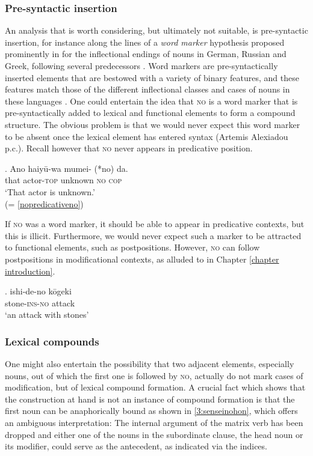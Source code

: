 \subsubsection{Pre-syntactic insertion}

An analysis that is worth considering, but ultimately not suitable, is pre-syntactic insertion, for instance along the lines of a \textit{word marker} hypothesis proposed prominently in \citet{alex:2008:class} for the inflectional endings of nouns in  German,  Russian and  Greek, following several predecessors \citep{harris:1991:exponence, ritter:1993:where, aronoff:1996:morphology, oltra:1999:on, oltra:2005:stress}. Word markers are pre-syntactically inserted elements that are bestowed with a variety of binary features, and these features match those of the different inflectional classes and cases of nouns in these languages \citep[33]{alex:2008:class}. One could entertain the idea that \textsc{no} is a word marker that is pre-syntactically added to lexical and functional elements to form a compound structure. The obvious problem is that we would never expect this word marker to be absent once the lexical element has entered syntax (Artemis Alexiadou p.c.). Recall however that \textsc{no} never appears in predicative position. 

\exg. Ano haiyū-wa mumei- (*no) da.\\
that actor-\textsc{top} unknown \textsc{no} \textsc{cop}\\
`That actor is unknown.’ \\ \null \hfill (= \ref{nopredicativeno})

If \textsc{no} was a word marker, it should be able to appear in predicative contexts, but this is illicit. Furthermore, we would never expect such a marker to be attracted to functional elements, such as postpositions. However, \textsc{no} can follow postpositions in modificational contexts, as alluded to in Chapter \ref{chapter introduction}.

\exg. ishi-de-no kōgeki\\
stone-\textsc{ins-no} attack\\
`an attack with stones' \null \hfill \citep[248]{saito:2008:N}

\subsubsection{Lexical compounds}

One might also entertain the possibility that two adjacent elements, especially nouns, out of which the first one is followed by \textsc{no}, actually do not mark cases of modification, but of lexical compound formation. A crucial fact which shows that the construction at hand is not an instance of compound formation is that the first noun can be anaphorically bound as shown in \ref{3:senseinohon}, which offers an ambiguous interpretation: The internal argument of the matrix verb has been dropped and either one of the nouns in the subordinate clause, the head noun or its modifier, could serve as the antecedent, as indicated via the indices.

